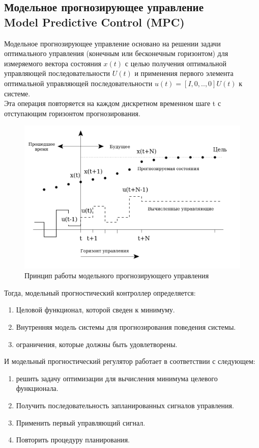 \documentclass[a4paper,12pt]{article}
\begin{document}
\subsection{Модельное прогнозирующее управление\\
Model Predictive Control (MPC)}
Модельное прогнозирующее управление основано на решении задачи оптимального управления (конечным или бесконечным горизонтом) для измеряемого вектора состояния $x (t)$ с целью получения оптимальной управляющей последовательности $U(t)$ и применения первого элемента оптимальной управляющей последовательности $u(t)=[I,0,..,0] U(t)$ к системе.\\
Эта операция повторяется на каждом дискретном временном шаге t с отступающим горизонтом прогнозирования.\\
\begin{figure}[H]
    \centering
    \includegraphics[width=\textwidth]{img/mpc_diag(1).png}
    \caption{Принцип работы модельного прогнозирующего управления}
    \label{fig:my_label}
\end{figure}

Тогда, модельный прогностический контроллер определяется:
\begin{enumerate}
    \item Целовой функционал, которой сведен к минимуму.
\item Внутренняя модель системы для прогнозирования поведения системы.
\item ограничения, которые должны быть удовлетворены.
\end{enumerate}
\newpage
И модельный прогностический регулятор работает в соответствии с следующем:
\begin{enumerate}[noitemsep]
    \item решить задачу оптимизации для вычисления минимума целевого функционала.
\item  Получить последовательность запланированных сигналов управления.
\item  Применить первый управляющий сигнал.
\item  Повторить процедуру планирования.
\end{enumerate}
\end{document}
